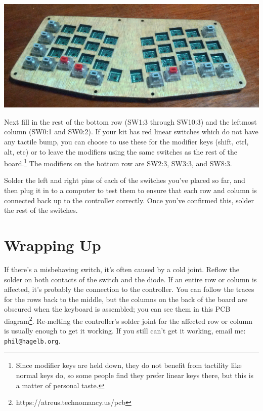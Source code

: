 \documentclass[landscape,twocolumn]{article}
\begin{document}
\vspace{1em}
\begin{center}
  \includegraphics[width=0.9\columnwidth]{some-switches.jpg}
\end{center}
\vspace{1em}

Next fill in the rest of the bottom row (SW1:3 through SW10:3) and the
leftmost column (SW0:1 and SW0:2). If your kit has red linear switches
which do not have any tactile bump, you can choose to use these for
the modifier keys (shift, ctrl, alt, etc) or to leave the modifiers
using the same switches as the rest of the board.\footnote{Since
  modifier keys are held down, they do not benefit from tactility like
  normal keys do, so some people find they prefer linear keys there,
  but this is a matter of personal taste.} The modifiers on the bottom
row are SW2:3, SW3:3, and SW8:3.

\vspace{1em}

Solder the left and right pins of each of the switches you've placed
so far, and then plug it in to a computer to test them to ensure that
each row and column is connected back up to the controller
correctly. Once you've confirmed this, solder the rest of the
switches.

\section{Wrapping Up}

If there's a misbehaving switch, it's often caused by a cold
joint. Reflow the solder on both contacts of the switch and the
diode. If an entire row or column is affected, it's probably the
connection to the controller. You can follow the traces for the rows
back to the middle, but the columns on the back of the board are
obscured when the keyboard is assembled; you can see them in this PCB
diagram\footnote{https://atreus.technomancy.us/pcb}. Re-melting the
controller's solder joint for the affected row or column is usually
enough to get it working. If you still can't
get it working, email me: \texttt{phil@hagelb.org}.
\end{document}
